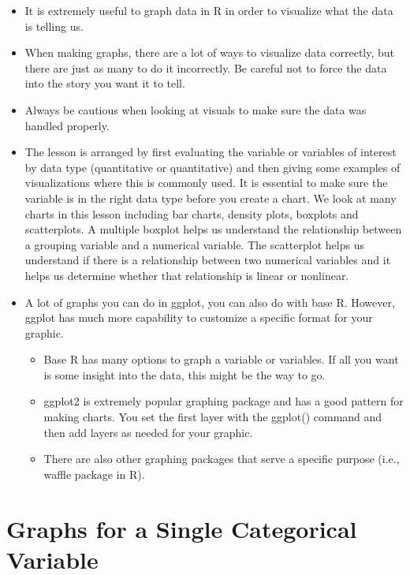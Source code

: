 \documentclass[
  letterpaper,
  DIV=11,
  numbers=noendperiod]{scrreprt}
\providecommand{\tightlist}{%
  \setlength{\itemsep}{0pt}\setlength{\parskip}{0pt}}\usepackage{longtable,booktabs,array}
\begin{document}
\begin{itemize}
\item
  It is extremely useful to graph data in R in order to visualize what
  the data is telling us.
\item
  When making graphs, there are a lot of ways to visualize data
  correctly, but there are just as many to do it incorrectly. Be careful
  not to force the data into the story you want it to tell.
\item
  Always be cautious when looking at visuals to make sure the data was
  handled properly.
\item
  The lesson is arranged by first evaluating the variable or variables
  of interest by data type (quantitative or quantitative) and then
  giving some examples of visualizations where this is commonly used. It
  is essential to make sure the variable is in the right data type
  before you create a chart. We look at many charts in this lesson
  including bar charts, density plots, boxplots and scatterplots. A
  multiple boxplot helps us understand the relationship between a
  grouping variable and a numerical variable. The scatterplot helps us
  understand if there is a relationship between two numerical variables
  and it helps us determine whether that relationship is linear or
  nonlinear.
\item
  A lot of graphs you can do in ggplot, you can also do with base R.
  However, ggplot has much more capability to customize a specific
  format for your graphic.

  \begin{itemize}
  \tightlist
  \item
    Base R has many options to graph a variable or variables. If all you
    want is some insight into the data, this might be the way to go.
  \item
    ggplot2 is extremely popular graphing package and has a good pattern
    for making charts. You set the first layer with the ggplot() command
    and then add layers as needed for your graphic.
  \item
    There are also other graphing packages that serve a specific purpose
    (i.e., waffle package in R).
  \end{itemize}
\end{itemize}


\chapter{Graphs for a Single Categorical
Variable}\label{graphs-for-a-single-categorical-variable}
\end{document}
